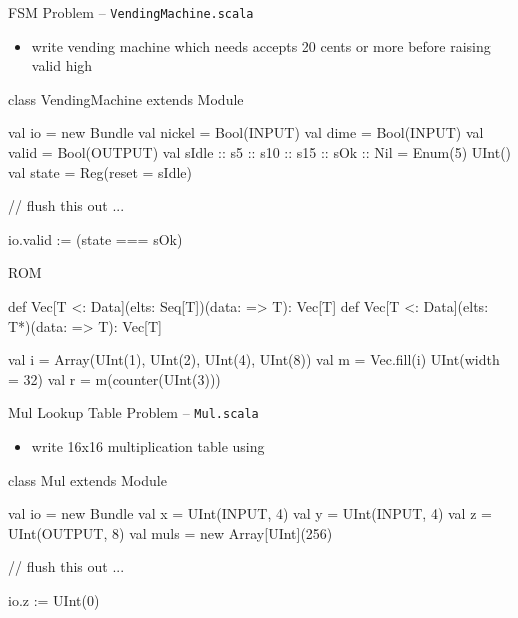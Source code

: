 \documentclass[xcolor=pdflatex,dvipsnames,table]{beamer}
\begin{document}
\begin{frame}[fragile]{FSM Problem -- \tt VendingMachine.scala}
\begin{itemize}
\item write vending machine which needs accepts 20 cents or more before raising valid high
\end{itemize}
\begin{scala}
class VendingMachine extends Module {
  val io = new Bundle {
    val nickel = Bool(INPUT)
    val dime   = Bool(INPUT)
    val valid  = Bool(OUTPUT) }
  val sIdle :: s5 :: s10 :: s15 :: sOk :: Nil = Enum(5){ UInt() }
  val state = Reg(reset = sIdle)

  // flush this out ...

  io.valid := (state === sOk)
}
\end{scala}
\end{frame}

\begin{frame}[fragile]{ROM}

\begin{scala}
def Vec[T <: Data](elts: Seq[T])(data: => T): Vec[T]
def Vec[T <: Data](elts: T*)(data: => T): Vec[T]
\end{scala}

\begin{scala}
val i = Array(UInt(1), UInt(2), UInt(4), UInt(8))
val m = Vec.fill(i){ UInt(width = 32) }
val r = m(counter(UInt(3)))
\end{scala}

% 

\end{frame}

\begin{frame}[fragile]{Mul Lookup Table Problem -- \tt Mul.scala}
\begin{itemize}
\item write 16x16 multiplication table using 
\end{itemize}
\begin{scala}
class Mul extends Module {
  val io = new Bundle {
    val x   = UInt(INPUT, 4)
    val y   = UInt(INPUT, 4)
    val z   = UInt(OUTPUT, 8)
  }
  val muls = new Array[UInt](256)

  // flush this out ...

  io.z := UInt(0)
}
\end{scala}

\end{frame}
\end{document}
